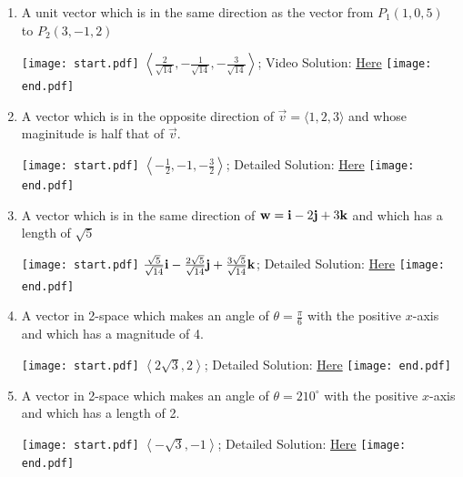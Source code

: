 \documentclass[12pt]{article}
\begin{document}
\begin{enumerate}
\begin{enumerate}
\item A unit vector which is in the same direction as the vector from $P_1(1,0,5)$ to $P_2(3,-1,2)$

\texttt{[image: start.pdf]}
{{$\left \langle \frac{2}{\sqrt{14}},-\frac{1}{\sqrt{14}},-\frac{3}{\sqrt{14}} \right \rangle$; Video Solution: \textcolor{blue}{\href{https://www.youtube.com/watch?v=DyOlo-QJJfI}{Here}}}}
\texttt{[image: end.pdf]}


\item A vector which is in the opposite direction of $\overrightarrow{v}=\langle1,2,3\rangle$ and whose maginitude is half that of $\overrightarrow{v}$.

\texttt{[image: start.pdf]}
{{$\left \langle -\frac{1}{2},-1,-\frac{3}{2}\right\rangle$; Detailed Solution: \textcolor{blue}{\href{http://www.math.drexel.edu/classes/Calculus/resources/Math200HW/Solutions/02_200_Vectors_07.pdf}{Here}}}}
\texttt{[image: end.pdf]}


\item A vector which is in the same direction of ${\bf w}={\bf i}-2{\bf j}+3{\bf k}$ and which has a length of $\sqrt{5}$

\texttt{[image: start.pdf]}
{{$\frac{\sqrt{5}}{\sqrt{14}}{\bf i}-\frac{2\sqrt{5}}{\sqrt{14}}{\bf j}+\frac{3\sqrt{5}}{\sqrt{14}}{\bf k}$; Detailed Solution: \textcolor{blue}{\href{http://www.math.drexel.edu/classes/Calculus/resources/Math200HW/Solutions/02_200_Vectors_07.pdf}{Here}}}}
\texttt{[image: end.pdf]}


\item A vector in 2-space which makes an angle of $\theta=\frac{\pi}{6}$ with the positive $x$-axis and which has a magnitude of 4.

\texttt{[image: start.pdf]}
{{$\left \langle 2\sqrt{3}, 2 \right \rangle$; Detailed Solution: \textcolor{blue}{\href{http://www.math.drexel.edu/classes/Calculus/resources/Math200HW/Solutions/02_200_Vectors_07.pdf}{Here}}}}
\texttt{[image: end.pdf]}


\item A vector in 2-space which makes an angle of $\theta=210^{\circ}$ with the positive $x$-axis and which has a length of 2.

\texttt{[image: start.pdf]}
{{$\left \langle -\sqrt{3},-1 \right \rangle$; Detailed Solution: \textcolor{blue}{\href{http://www.math.drexel.edu/classes/Calculus/resources/Math200HW/Solutions/02_200_Vectors_07.pdf}{Here}}}}
\texttt{[image: end.pdf]}


\end{enumerate}


\end{enumerate}
\end{document}
